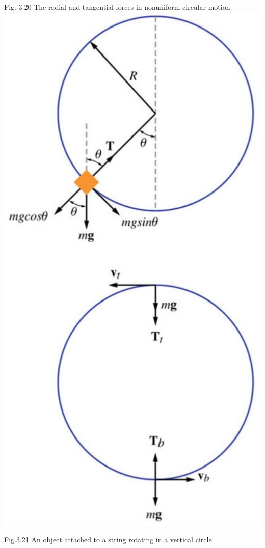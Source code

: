 \documentclass[10pt]{article}
\begin{document}
Fig. 3.20 The radial and tangential forces in nonuniform circular motion\\
\includegraphics[max width=\textwidth, center]{2024_09_13_db1f357d2aad0a03eb2eg-059(4)}

Fig.3.21 An object attached to a string rotating in a vertical circle
\end{document}
